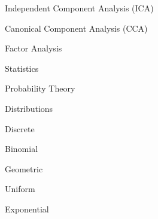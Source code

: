 \documentclass[11pt]{article}
\begin{document}
\begin{enumerate}
\begin{item}
\begin{enumerate}
          \begin{item}
            Independent Component Analysis (ICA)
          \end{item}

          \begin{item}
            Canonical Component Analysis (CCA)
          \end{item}

          \begin{item}
            Factor Analysis
          \end{item}


      \end{enumerate}

    \end{item}

    \begin{item}

      Statistics

      \begin{enumerate}

          \begin{item}
            Probability Theory
          \end{item}

          \begin{item}

            Distributions

            \begin{enumerate}

                \begin{item}

                  Discrete

                  \begin{enumerate}

                      \begin{item}
                        Binomial
                      \end{item}

                      \begin{item}
                        Geometric
                      \end{item}

                      \begin{item}
                        Uniform
                      \end{item}

                      \begin{item}
                        Exponential
                      \end{item}


\end{enumerate}
\end{item}
\end{enumerate}
\end{item}
\end{enumerate}
\end{item}
\end{enumerate}
\end{document}
